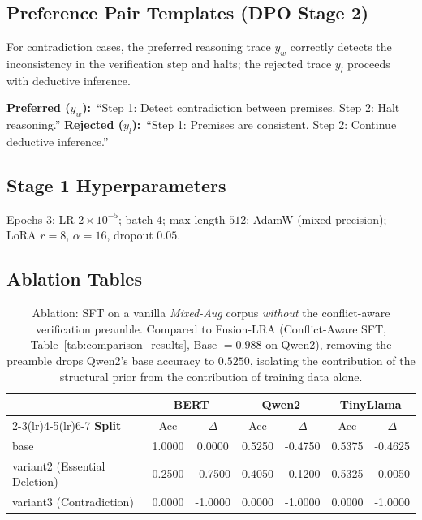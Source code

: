 \documentclass{article}
\begin{document}
\subsection{Preference Pair Templates (DPO Stage 2)}
\label{app:pref-pairs}
For contradiction cases, the preferred reasoning trace $y_w$ correctly detects the inconsistency in the verification step and halts; the rejected trace $y_l$ proceeds with deductive inference.

\textbf{Preferred ($y_w$):}~``Step 1: Detect contradiction between premises. Step 2: Halt reasoning.''\quad
\textbf{Rejected ($y_l$):}~``Step 1: Premises are consistent. Step 2: Continue deductive inference.''

\subsection{Stage 1 Hyperparameters}
\label{app:hyper}
Epochs $3$; LR $2{\times}10^{-5}$; batch $4$; max length $512$; AdamW (mixed precision); LoRA $r{=}8$, $\alpha{=}16$, dropout $0.05$.

\subsection{Ablation Tables}
\label{app:ablation}

\begin{table}[h]
\centering\small
\caption{Ablation: SFT on a vanilla \emph{Mixed-Aug} corpus \emph{without} the conflict-aware verification preamble. Compared to Fusion-LRA (Conflict-Aware SFT, Table~\ref{tab:comparison_results}, Base $=0.988$ on Qwen2), removing the preamble drops Qwen2's base accuracy to $0.5250$, isolating the contribution of the structural prior from the contribution of training data alone.}
\label{tab:stage1_results}
\begin{tabular}{lcccccc}
\toprule
& \multicolumn{2}{c}{\textbf{BERT}} & \multicolumn{2}{c}{\textbf{Qwen2}} & \multicolumn{2}{c}{\textbf{TinyLlama}} \\
\cmidrule(lr){2-3}\cmidrule(lr){4-5}\cmidrule(lr){6-7}
\textbf{Split} & Acc & $\Delta$ & Acc & $\Delta$ & Acc & $\Delta$ \\
\midrule
base                            & 1.0000 & 0.0000 & 0.5250 & -0.4750 & 0.5375 & -0.4625 \\
variant2 (Essential Deletion)   & 0.2500 & -0.7500 & 0.4050 & -0.1200 & 0.5325 & -0.0050 \\
variant3 (Contradiction)        & 0.0000 & -1.0000 & 0.0000 & -1.0000 & 0.0000 & -1.0000 \\
\bottomrule
\end{tabular}
\end{table}
\end{document}
